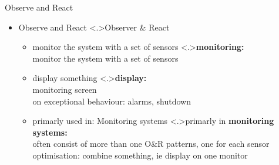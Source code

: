 \documentclass[ngerman={babel}, utf8, bigger, t, xcolor={table,dvipsnames}, ompress, hyperref={bookmarks,colorlinks},red]{beamer}
\begin{document}
\begin{frame}{Observe and React}
	\begin{itemize}
		\item Observe and React
		\note<.>{Observer \& React}
		\begin{itemize}
			\item monitor the system with a set of sensors
			\note<.>{\textbf{monitoring:}\\ monitor the system with a set of sensors}
			\item display something
			\note<.>{\textbf{display:}\\ monitoring screen \\ on exceptional behaviour: alarms, shutdown\\ }
			\item primarly used in: Monitoring systems
			\note<.>{primarly in \textbf{monitoring systems:}\\ often consist of more than one O\&R patterns, one for each sensor \\ optimisation: combine something, ie display on one monitor}
		\end{itemize}
	\end{itemize}
\end{frame}
\end{document}

